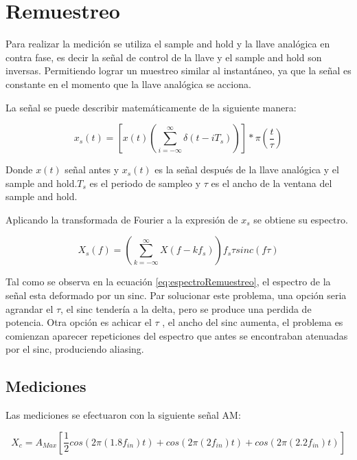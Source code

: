 \documentclass[../../ASSD_TP1_G7.tex]{subfiles}
\begin{document}
\chapter*{Remuestreo}
Para realizar la medición se utiliza el sample and hold y la llave analógica en contra fase, es decir la se\~nal de control de la llave y el sample and hold son inversas. Permitiendo lograr un muestreo similar al instantáneo, ya que la se\~nal es constante en el momento que la llave analógica se acciona.

La se\~nal se puede describir matemáticamente de la siguiente manera:

\begin{equation}
x_{s}(t)=\left[ x(t)\left( \sum_{i=-\infty}^{\infty} \delta(t - i T_s) \right) \right]* \pi(\frac{t}{\tau})
\end{equation}

\par Donde $x(t)$ se\~nal antes y $x_{s}(t)$ es la se\~nal después de la llave analógica y el sample and hold.$T_s$ es el periodo de sampleo y $\tau$ es el ancho de la ventana del sample and hold.
\par Aplicando la transformada de Fourier a la expresión de $x_{s}$ se obtiene su espectro.

\begin{equation}
X_{s}(f)=\left( \sum_{k=-\infty}^{\infty} X(f - k f _s) \right) f _s \tau sinc(f \tau) \label{eq:espectroRemuestreo}
\end{equation}

Tal como se observa en la ecuación \ref{eq:espectroRemuestreo}, el espectro de la se\~nal esta deformado por un sinc. Par solucionar este problema, una opción seria agrandar el $\tau$, el sinc tendería a la delta, pero se produce una perdida de potencia. Otra opción es achicar el $\tau$ , el ancho del sinc aumenta, el problema es comienzan aparecer repeticiones del espectro que antes se encontraban atenuadas por el sinc, produciendo aliasing.



\section*{Mediciones}

Las mediciones se efectuaron con la siguiente se\~nal AM:

\begin{equation}
X_c=A_{Max}[\frac{1}{2}cos(2\pi (1.8 f_{in})t)+cos(2\pi (2 f_{in})t)+cos(2\pi (2.2 f_{in})t)]
\end{equation}\label{eq:inputSignlanAM}
\end{document}
